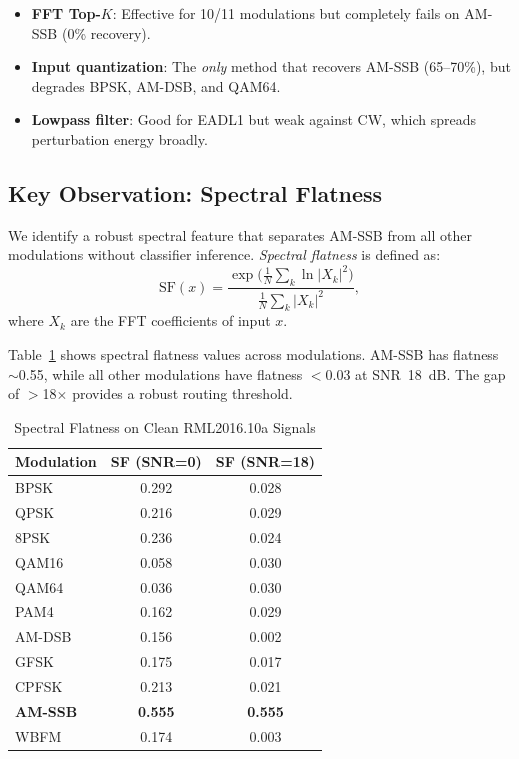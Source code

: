 \documentclass[letterpaper,twocolumn,10pt]{article}
\begin{document}
\begin{itemize}
\item \textbf{FFT Top-$K$}: Effective for 10/11 modulations but
  completely fails on AM-SSB (0\% recovery).
\item \textbf{Input quantization}: The \emph{only} method that
  recovers AM-SSB (65--70\%), but degrades BPSK, AM-DSB, and QAM64.
\item \textbf{Lowpass filter}: Good for EADL1 but weak against CW,
  which spreads perturbation energy broadly.
\end{itemize}

\subsection{Key Observation: Spectral Flatness}

We identify a robust spectral feature that separates AM-SSB from all
other modulations without classifier inference. \emph{Spectral
flatness} is defined as:
\begin{equation}
\text{SF}(x) = \frac{\exp\!\bigl(\frac{1}{N}\sum_{k}\ln |X_k|^2\bigr)}
                     {\frac{1}{N}\sum_{k}|X_k|^2},
\label{eq:flatness}
\end{equation}
where $X_k$ are the FFT coefficients of input $x$.

Table~\ref{tab:flatness} shows spectral flatness values across
modulations. AM-SSB has flatness $\sim$0.55, while all other
modulations have flatness $<$0.03 at SNR~18~dB. The gap
of $>$18$\times$ provides a robust routing threshold.

\begin{table}[t]
\caption{Spectral Flatness on Clean RML2016.10a Signals}
\label{tab:flatness}
\centering
\small
\begin{tabular}{lcc}
\toprule
Modulation & SF (SNR=0) & SF (SNR=18) \\
\midrule
BPSK   & 0.292 & 0.028 \\
QPSK   & 0.216 & 0.029 \\
8PSK   & 0.236 & 0.024 \\
QAM16  & 0.058 & 0.030 \\
QAM64  & 0.036 & 0.030 \\
PAM4   & 0.162 & 0.029 \\
AM-DSB & 0.156 & 0.002 \\
GFSK   & 0.175 & 0.017 \\
CPFSK  & 0.213 & 0.021 \\
\textbf{AM-SSB} & \textbf{0.555} & \textbf{0.555} \\
WBFM   & 0.174 & 0.003 \\
\bottomrule
\end{tabular}
\end{table}
\end{document}
